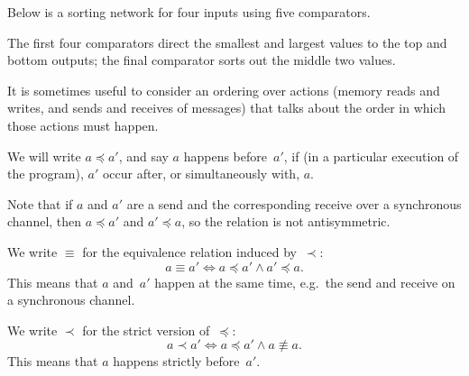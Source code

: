 \documentclass[notes,color]{sepslide0}
\def\comp#1#2#3{%
  \draw (#1)+(#3,0) node {$\bullet$};
  \draw (#2)+(#3,0) node (n2) {$\bullet$};
  \draw[thick] (#1)+(#3,0) -- (n2.center);
}
\begin{document}

\begin{slide}

Below is a sorting network for four inputs using five comparators.
%
\begin{center}
\end{center}
%
The first four comparators direct the smallest and largest values to the top
and bottom outputs; the final comparator sorts out the middle two values.
\end{slide}


\begin{slide}

It is sometimes useful to consider an ordering over actions (memory reads and
writes, and sends and receives of messages) that talks about the order in
which those actions must happen.

We will write $a \preceq a'$, and say $a$ happens before~$a'$, if (in a
particular execution of the program), $a'$ occur after, or simultaneously
with, $a$.

Note that if $a$ and $a'$ are a send and the corresponding receive over a
synchronous channel, then $a \preceq a'$ and $a' \preceq a$, so the relation
is not antisymmetric. 
\end{slide}


\begin{slide}

We write $\equiv$ for the equivalence relation induced by~$\prec$:
\[
a \equiv a' \iff a \preceq a' \land a' \preceq a.
\]
This means that $a$ and~$a'$ happen at the same time, e.g.~the send and
receive on a synchronous channel.

We write $\prec$ for the strict version of~$\preceq$:
\[
a \prec a' \iff a \preceq a' \land a \not\equiv a.
\]
This means that $a$ happens strictly before~$a'$.
\end{slide}
\end{document}
